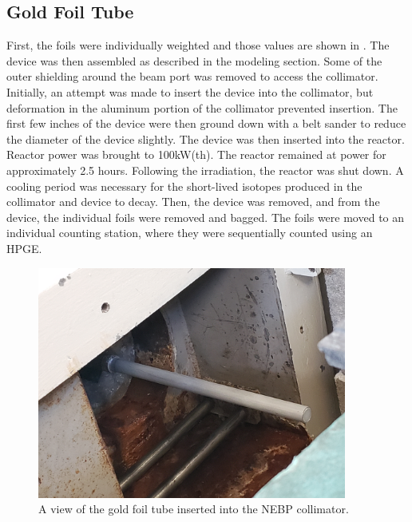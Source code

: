\subsection{Gold Foil Tube}

First, the foils were individually weighted and those values are shown in .
The device was then assembled as described in the modeling section.
Some of the outer shielding around the beam port was removed to access the collimator.
Initially, an attempt was made to insert the device into the collimator, but deformation in the aluminum portion of the collimator prevented insertion.
The first few inches of the device were then ground down with a belt sander to reduce the diameter of the device slightly.
The device was then inserted into the reactor.
Reactor power was brought to 100kW(th).
The reactor remained at power for approximately 2.5 hours.
Following the irradiation, the reactor was shut down.
A cooling period was necessary for the short-lived isotopes produced in the collimator and device to decay.
Then, the device was removed, and from the device, the individual foils were removed and bagged.
The foils were moved to an individual counting station, where they were sequentially counted using an HPGE.

\begin{figure}[htb]
\centering
\includegraphics[height=3in]{tex/figures/ft_au_in_beam.jpg}
\caption[Gold Foil Tube Experiment]{A view of the gold foil tube inserted into the NEBP collimator.}
\label{fig:ft_au_in_beam}
\end{figure}

